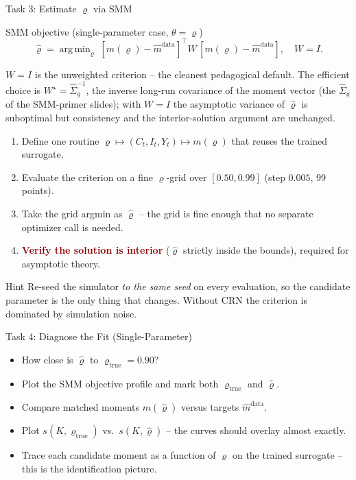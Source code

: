 \documentclass[10pt,aspectratio=169]{beamer}
\newcommand{\emphc}[1]{\textbf{\textcolor{darkred}{#1}}}
\DeclareMathOperator*{\argmin}{arg\,min}
\begin{document}
\begin{frame}{Task 3: Estimate $\varrho$ via SMM}
\begin{block}{SMM objective (single-parameter case, $\theta = \varrho$)}
\vspace{-4pt}
\[\hat\varrho = \argmin_{\varrho}\; [m(\varrho) - \hat{m}^{\mathrm{data}}]^\top W \,[m(\varrho) - \hat{m}^{\mathrm{data}}], \quad W = I.\]
\vspace{-8pt}

{\scriptsize $W = I$ is the unweighted criterion -- the cleanest pedagogical default. The efficient choice is $W^\star = \widehat\Sigma_g^{-1}$, the inverse long-run covariance of the moment vector (the $\widehat\Sigma_g$ of the SMM-primer slides); with $W = I$ the asymptotic variance of $\hat\varrho$ is suboptimal but consistency and the interior-solution argument are unchanged.}
\end{block}
\begin{enumerate}
  \item Define one routine $\varrho \mapsto (C_t, I_t, Y_t) \mapsto m(\varrho)$ that reuses the trained surrogate.
  \item Evaluate the criterion on a fine $\varrho$-grid over $[0.50, 0.99]$ (step $0.005$, 99 points).
  \item Take the grid argmin as $\hat\varrho$ -- the grid is fine enough that no separate optimizer call is needed.
  \item \emphc{Verify the solution is interior} ($\hat\varrho$ strictly inside the bounds), required for asymptotic theory.
\end{enumerate}
\begin{alertblock}{Hint}
Re-seed the simulator \emph{to the same seed} on every evaluation, so the candidate parameter is the only thing that changes. Without CRN the criterion is dominated by simulation noise.
\end{alertblock}
\end{frame}

\begin{frame}{Task 4: Diagnose the Fit (Single-Parameter)}
\begin{itemize}
  \item How close is $\hat\varrho$ to $\varrho_{\text{true}} = 0.90$?
  \item Plot the SMM objective profile and mark both $\varrho_{\text{true}}$ and $\hat\varrho$.
  \item Compare matched moments $m(\hat\varrho)$ versus targets $\hat{m}^{\mathrm{data}}$.
  \item Plot $s(K, \varrho_{\text{true}})$ vs.\ $s(K, \hat\varrho)$ -- the curves should overlay almost exactly.
  \item Trace each candidate moment as a function of $\varrho$ on the trained surrogate -- this is the identification picture.
\end{itemize}
\end{frame}
\end{document}

